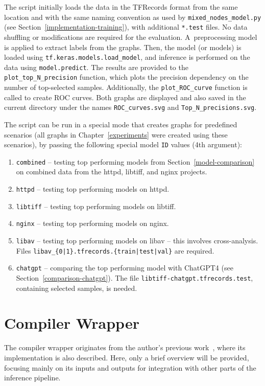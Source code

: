The script initially loads the data in the TFRecords format from the same location and with the same naming convention as used by \texttt{mixed\_nodes\_model.py} (see Section~\ref{implementation-training}), with additional \texttt{*.test} files. No data shuffling or modifications are required for the evaluation. A~preprocessing model is applied to extract labels from the graphs. Then, the model (or models) is loaded using \texttt{tf.keras.models.load\_model}, and inference is performed on the data using \texttt{model.predict}. The results are provided to the \texttt{plot\_top\_N\_precision} function, which plots the precision dependency on the number of top-selected samples. Additionally, the \texttt{plot\_ROC\_curve} function is called to create ROC curves. Both graphs are displayed and also saved in the current directory under the names \texttt{ROC\_curves.svg} and \texttt{Top\_N\_precisions.svg}.

The script can be run in a special mode that creates graphs for predefined scenarios (all graphs in Chapter~\ref{experiments} were created using these scenarios), by passing the following special model \texttt{ID} values (4th argument):
\begin{enumerate}
    \item \texttt{combined} -- testing top performing models from Section~\ref{model-comparison} on combined data from the httpd, libtiff, and nginx projects.
    \item \texttt{httpd} -- testing top performing models on httpd.
    \item \texttt{libtiff} -- testing top performing models on libtiff.
    \item \texttt{nginx} -- testing top performing models on nginx.
    \item \texttt{libav} -- testing top performing models on libav -- this involves cross-analysis. Files \texttt{libav\_\{0|1\}.tfrecords.\{train|test|val\}} are required.
    \item \texttt{chatgpt} -- comparing the top performing model with ChatGPT4 (see Section~\ref{comparison-chatgpt}). The file \texttt{libtiff-chatgpt.tfrecords.test}, containing selected samples, is needed.
\end{enumerate}



\section{Compiler Wrapper}
\label{implementation-compiler-wrapper}
The compiler wrapper originates from the author's previous work~\cite{bc}, where its implementation is also described. Here, only a brief overview will be provided, focusing mainly on its inputs and outputs for integration with other parts of the inference pipeline.

